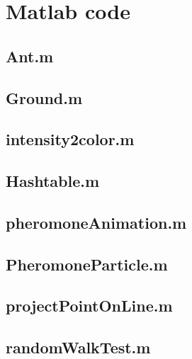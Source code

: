\documentclass[11pt]{article}
\begin{document}
\newpage

\appendix
\section{Matlab code}
\subsection{Ant.m}


\subsection{Ground.m}


\subsection{intensity2color.m}


\subsection{Hashtable.m}


\subsection{pheromoneAnimation.m}


\subsection{PheromoneParticle.m}


\subsection{projectPointOnLine.m}


\subsection{randomWalkTest.m}

\end{document}
